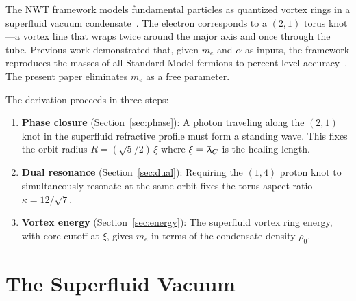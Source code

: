 \documentclass[11pt,a4paper]{article}
\newcommand{\lambdabar}{\mkern0.75mu\mathchar'26\mkern-9.75mu\lambda}
\begin{document}
The NWT framework models fundamental particles as quantized vortex
rings in a superfluid vacuum condensate~\cite{paper1,paper2}.  The
electron corresponds to a $(2,1)$ torus knot---a vortex line that
wraps twice around the major axis and once through the tube.  Previous
work demonstrated that, given $m_e$ and $\alpha$ as inputs, the
framework reproduces the masses of all Standard Model fermions to
percent-level accuracy~\cite{paper3,paper4}.  The present paper
eliminates $m_e$ as a free parameter.

The derivation proceeds in three steps:
\begin{enumerate}
  \item \textbf{Phase closure} (Section~\ref{sec:phase}): A photon
    traveling along the $(2,1)$ knot in the superfluid refractive
    profile must form a standing wave.  This fixes the orbit radius
    $R = (\sqrt{5}/2)\,\xi$ where $\xi = \lambdabar_C$ is the
    healing length.
  \item \textbf{Dual resonance} (Section~\ref{sec:dual}): Requiring
    the $(1,4)$ proton knot to simultaneously resonate at the same
    orbit fixes the torus aspect ratio $\kappa = 12/\sqrt{7}$.
  \item \textbf{Vortex energy} (Section~\ref{sec:energy}): The
    superfluid vortex ring energy, with core cutoff at $\xi$, gives
    $m_e$ in terms of the condensate density $\rho_0$.
\end{enumerate}


\section{The Superfluid Vacuum}
\label{sec:vacuum}
\end{document}
